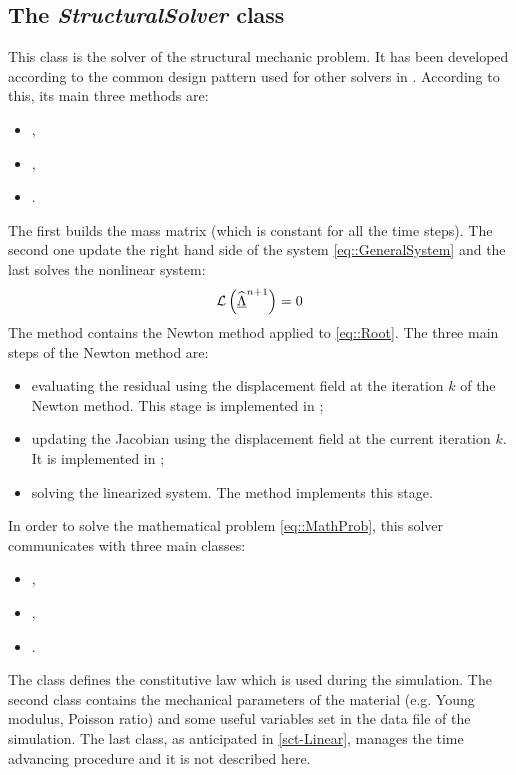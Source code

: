 \subsection{The \textit{StructuralSolver} class}
This class is the solver of the structural mechanic problem. It has been developed according to the common design pattern used for other solvers in \LV. According to this, its main three methods are:
\begin{itemize}
  \item {},
  \item {},
  \item {}.
\end{itemize}
The first builds the mass matrix \mass (which is constant for all the time steps). The second one update the right hand side of the system \eqref{eq::GeneralSystem} and the last solves the nonlinear system:
\begin{equation}
  \mathcal{L}\left(\widehat{\underline{\Lambda}}^{n+1}\right)=0
  \label{eq::Root}
\end{equation}
The  method contains the Newton method applied to \eqref{eq::Root}. The three main steps of the Newton method are:
\begin{itemize}
  \item evaluating the residual using the displacement field at the iteration $k$ of the Newton method. This stage is implemented in ;
  \item updating the Jacobian using the displacement field at the current iteration $k$. It is implemented in ;
  \item solving the linearized system. The method  implements this stage.
\end{itemize}
In order to solve the mathematical problem \eqref{eq::MathProb}, this solver communicates with three main classes:
\begin{itemize}
  \item {},
  \item {},
  \item {}.
\end{itemize}
The  class defines the constitutive law which is used during the simulation. The second class contains the mechanical parameters of the material (e.g. Young modulus, Poisson ratio) and some useful variables set in the data file of the simulation. The last class, as anticipated in \ref{sct-Linear}, manages the time advancing procedure and it is not described here.\\

